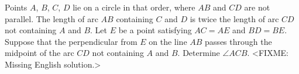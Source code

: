 \problem
Points $A$, $B$, $C$, $D$ lie on a circle in that order, where $AB$ and $CD$
are not parallel.
The length of arc $AB$ containing $C$ and $D$ is twice the length of arc $CD$
not containing $A$ and $B$.
Let $E$ be a point satisfying $AC = AE$ and $BD = BE$.
Suppose that the perpendicular from $E$ on the line $AB$ passes through the
midpoint of the arc $CD$ not containing $A$ and $B$.
Determine $\angle ACB$.
\solution
<FIXME: Missing English solution.>
\endproblem
